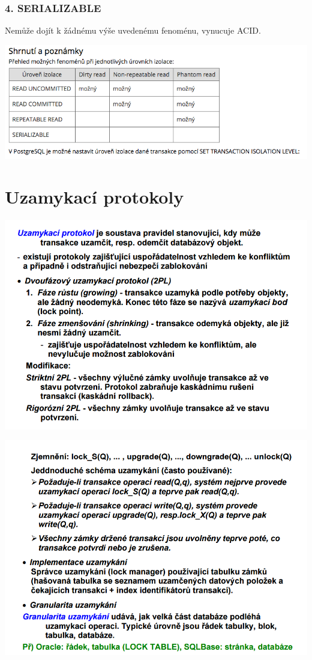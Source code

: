 \documentclass[10pt,a4paper]{article}
\begin{document}
\subsubsection*{4. SERIALIZABLE}
Nemůže dojít k žádnému výše uvedenému fenoménu, vynucuje ACID.

\includegraphics[scale=0.6]{img/ACIDNote}

\section{Uzamykací protokoly}
\includegraphics[scale=0.5]{img/82}

\includegraphics[scale=0.5]{img/83}
\end{document}
